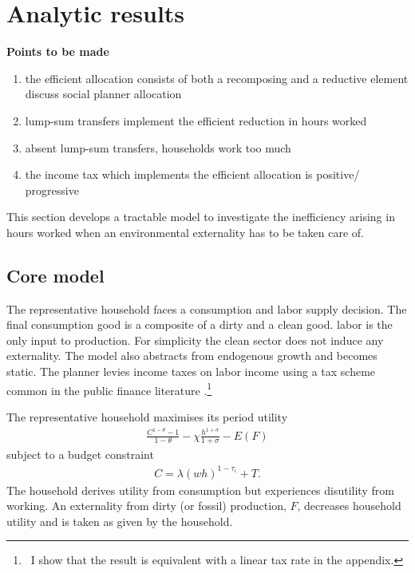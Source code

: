 \section{Analytic results}
\textbf{Points to be made}
\begin{enumerate}
\item the efficient allocation consists of both a recomposing and a reductive element \ar discuss social planner allocation \checkmark
\item lump-sum transfers implement the efficient reduction in hours worked \checkmark
\item absent lump-sum transfers, households work too much \checkmark
\item the income tax which implements the efficient allocation is positive/ progressive \checkmark
\end{enumerate}

This section develops a tractable model to investigate the inefficiency arising in hours worked when an environmental externality has to be taken care of. 

\subsection{Core model}
The representative household faces a consumption and labor supply decision. The final consumption good is a composite of a dirty and a clean good. labor is the only input to production. For simplicity the clean sector does not induce any externality. The model also abstracts from endogenous growth and becomes static. The planner levies income taxes on labor income using a tax scheme common in the public finance literature \citep{Heathcote2017OptimalFramework, Benabou2002TaxEfficiency}.\footnote{\ I show that the result is equivalent with a linear tax rate in the appendix.} 

The representative household maximises its period utility
\begin{align}
\frac{C^{1-\theta}-1}{1-\theta}-\chi \frac{h^{1+\sigma}}{1+\sigma}-E(F)
\end{align}
subject to a budget constraint
\begin{align}
	 C= \lambda(wh)^{1-\tau_{\iota}}+T.
\end{align}
The household derives utility from consumption but experiences disutility from working. An externality from dirty (or fossil) production, $F$, decreases household utility and is taken as given by the household.

